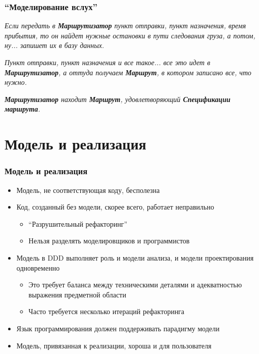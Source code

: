 \documentclass[xetex,mathserif,serif]{beamer}
\begin{document}
	\begin{frame}
		\frametitle{``Моделирование вслух''}
		\textit{Если передать в \textbf{Маршрутизатор} пункт отправки, пункт назначения, время прибытия, то он найдет нужные остановки в пути следования груза, а потом, ну... запишет их в базу данных.}

		\vspace{3mm}

		\textit{Пункт отправки, пункт назначения и все такое... все это идет в \textbf{Маршрутизатор}, а оттуда получаем \textbf{Маршрут}, в котором записано все, что нужно.}

		\vspace{3mm}

		\textit{\textbf{Маршрутизатор} находит \textbf{Маршрут}, удовлетворяющий \textbf{Спецификации маршрута}.}
	\end{frame}

	\section{Модель и реализация}

	\begin{frame}
		\frametitle{Модель и реализация}
		\begin{itemize}
			\item Модель, не соответствующая коду, бесполезна
			\item Код, созданный без модели, скорее всего, работает неправильно
			\begin{itemize}
				\item ``Разрушительный рефакторинг''
				\item Нельзя разделять моделировщиков и программистов
			\end{itemize}
			\item Модель в DDD выполняет роль и модели анализа, и модели проектирования одновременно
			\begin{itemize}
				\item Это требует баланса между техническими деталями и адекватностью выражения предметной области
				\item Часто требуется несколько итераций рефакторинга
			\end{itemize}
			\item Язык программирования должен поддерживать парадигму модели
			\item Модель, привязанная к реализации, хороша и для пользователя
		\end{itemize}
	\end{frame}
\end{document}

